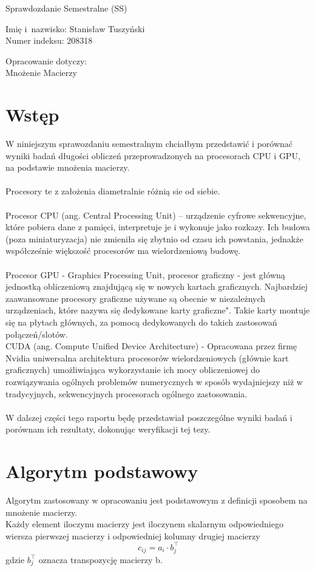 \documentclass[a4paper,12pt,oneside]{article}
\author{Stanisław Tuszyński}
\begin{document}
\begin{center}
{\large
Sprawdozdanie Semestralne (SS) }

Imię i~nazwisko: Stanisław Tuszyński \\
Numer indeksu: 208318


Opracowanie dotyczy: \\
{\large
Mnożenie Macierzy }

\end{center}
\section{Wstęp}
W niniejszym sprawozdaniu semestralnym chciałbym przedstawić  i porównać wyniki badań długości obliczeń przeprowadzonych na procesorach CPU i GPU, na podstawie mnożenia macierzy. \\
\\
Procesory te z założenia diametralnie różnią sie od siebie.\\
\\
Procesor CPU  (ang. Central Processing Unit) – urządzenie cyfrowe sekwencyjne, które pobiera dane z pamięci, interpretuje je i wykonuje jako rozkazy. Ich budowa (poza miniaturyzacja) nie zmieniła się zbytnio od czasu ich powstania, jednakże współcześnie większość procesorów ma wielordzeniową budowę.\\
\\
Procesor GPU - Graphics Processing Unit, procesor graficzny - jest główną jednostką obliczeniową znajdującą się w nowych kartach graficznych. Najbardziej zaawansowane procesory graficzne używane są obecnie w niezależnych urządzeniach, które nazywa się \"dedykowane karty 
graficzne". Takie karty montuje się na płytach głównych, za pomocą dedykowanych do takich zastosowań połączeń/slotów.  \\

 CUDA (ang. Compute Unified Device Architecture) - Opracowana przez firmę Nvidia uniwersalna architektura procesorów wielordzeniowych (głównie kart graficznych) umożliwiająca wykorzystanie ich mocy obliczeniowej do rozwiązywania ogólnych problemów numerycznych w sposób wydajniejszy niż w tradycyjnych, sekwencyjnych procesorach ogólnego zastosowania.\\
 \\
W dalszej części tego raportu będę przedstawiał poszczególne wyniki badań i porównam ich rezultaty, dokonując weryfikacji tej tezy.

\section{Algorytm podstawowy}
  Algorytm zastosowany w opracowaniu jest podstawowym z definicji sposobem na mnożenie macierzy. \\
  Każdy element iloczynu macierzy jest iloczynem skalarnym odpowiedniego wiersza pierwszej macierzy i odpowiedniej kolumny drugiej macierzy
\begin{equation}
c_{ij}=a_{i} \cdot b_{j}^\top
\end{equation}
gdzie $b_{j}^\top$ oznacza transpozycję macierzy b.
\end{document}

